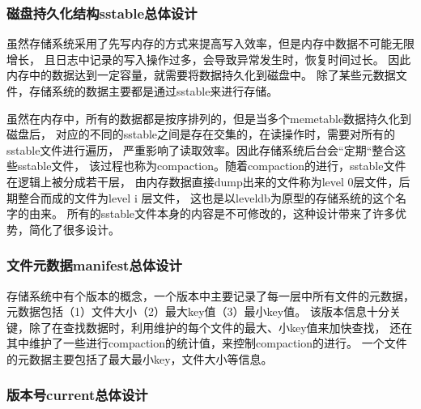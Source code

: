 		\subsubsection{磁盘持久化结构sstable总体设计}

		虽然存储系统采用了先写内存的方式来提高写入效率，但是内存中数据不可能无限增长，
		且日志中记录的写入操作过多，会导致异常发生时，恢复时间过长。
		因此内存中的数据达到一定容量，就需要将数据持久化到磁盘中。
		除了某些元数据文件，存储系统的数据主要都是通过sstable来进行存储。

		虽然在内存中，所有的数据都是按序排列的，但是当多个memetable数据持久化到磁盘后，
		对应的不同的sstable之间是存在交集的，在读操作时，需要对所有的sstable文件进行遍历，
		严重影响了读取效率。因此存储系统后台会“定期“整合这些sstable文件，
		该过程也称为compaction。随着compaction的进行，sstable文件在逻辑上被分成若干层，
		由内存数据直接dump出来的文件称为level 0层文件，后期整合而成的文件为level i 层文件，
		这也是以leveldb为原型的存储系统的这个名字的由来。
		所有的sstable文件本身的内容是不可修改的，这种设计带来了许多优势，简化了很多设计。

		\subsubsection{文件元数据manifest总体设计}

		存储系统中有个版本的概念，一个版本中主要记录了每一层中所有文件的元数据，
		元数据包括（1）文件大小（2）最大key值（3）最小key值。
		该版本信息十分关键，除了在查找数据时，利用维护的每个文件的最大、小key值来加快查找，
		还在其中维护了一些进行compaction的统计值，来控制compaction的进行。
		一个文件的元数据主要包括了最大最小key，文件大小等信息。
		

		\subsubsection{版本号current总体设计}

